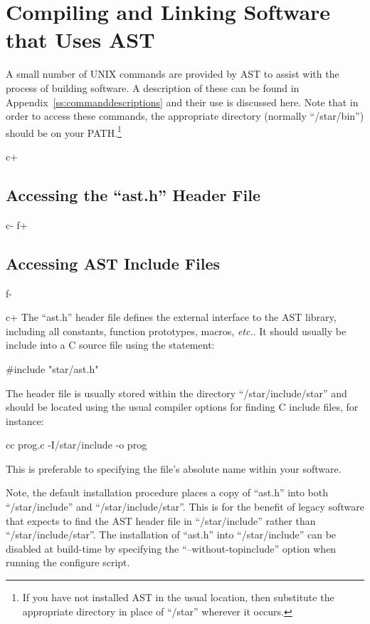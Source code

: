 \documentclass[twoside,11pt]{starlink}
\providecommand{\appref}[1]{Appendix~\ref{#1}}
\begin{document}
\cleardoublepage
\section{Compiling and Linking Software that Uses AST}

A small number of UNIX commands are provided by AST to assist with the
process of building software. A description of these can be found in
\appref{ss:commanddescriptions} and their use is discussed here.  Note
that in order to access these commands, the appropriate directory
(normally ``/star/bin'') should be on your PATH.\footnote{If you have
not installed AST in the usual location, then substitute the
appropriate directory in place of ``/star'' wherever it occurs.}

c+
\subsection{\label{ss:accessingheaderfile}Accessing the ``ast.h'' Header File}
c-
f+
\subsection{\label{ss:accessingheaderfile}Accessing AST Include Files}
f-

c+
The ``ast.h'' header file defines the external interface to the AST library,
including all constants, function prototypes, macros, \emph{etc.}. It
should usually be include into a C source file using the statement:

\small
\begin{terminalv}
#include "star/ast.h"
\end{terminalv}
\normalsize

The header file is usually stored within the directory ``/star/include/star''
and should be located using the usual compiler options for finding C
include files, for instance:

\small
\begin{terminalv}
cc prog.c -I/star/include -o prog
\end{terminalv}
\normalsize

This is preferable to specifying the file's absolute name within your
software.

Note, the default installation procedure places a copy of ``ast.h'' into
both ``/star/include'' and ``/star/include/star''. This is for the benefit of
legacy software that expects to find the AST header file in ``/star/include''
rather than ``/star/include/star''. The installation of ``ast.h'' into
``/star/include'' can be disabled at build-time by specifying the
``--without-topinclude'' option when running the configure script.
\end{document}
